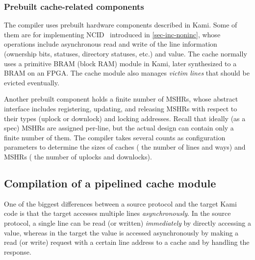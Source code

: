 \subsubsection{Prebuilt cache-related components}

The compiler uses prebuilt hardware components described in Kami.
Some of them are for implementing NCID~\cite{Zhao:2010} introduced in \autoref{sec-inc-noninc}, whose operations include asynchronous read and write of the line information (ownership bits, statuses, directory statuses, etc.) and value.
The cache normally uses a primitive BRAM (block RAM) module in Kami, later synthesized to a BRAM on an FPGA.
The cache module also manages \emph{victim lines} that should be evicted eventually.

Another prebuilt component holds a finite number of MSHRs, whose abstract interface includes registering, updating, and releasing MSHRs with respect to their types (uplock or downlock) and locking addresses.
Recall that ideally (as a spec) MSHRs are assigned per-line, but the actual design can contain only a finite number of them.
The compiler takes several counts as configuration parameters to determine the sizes of caches (\eg{} the number of lines and ways) and MSHRs (\eg{} the number of uplocks and downlocks).

\subsection{Compilation of a pipelined cache module}

One of the biggest differences between a source \hemiola{} protocol and the target Kami code is that the target accesses multiple lines \emph{asynchronously}.
In the source protocol, a single line can be read (or written) \emph{immediately} by directly accessing a value, whereas in the target the value is accessed asynchronously by making a read (or write) request with a certain line address to a cache and by handling the response.

